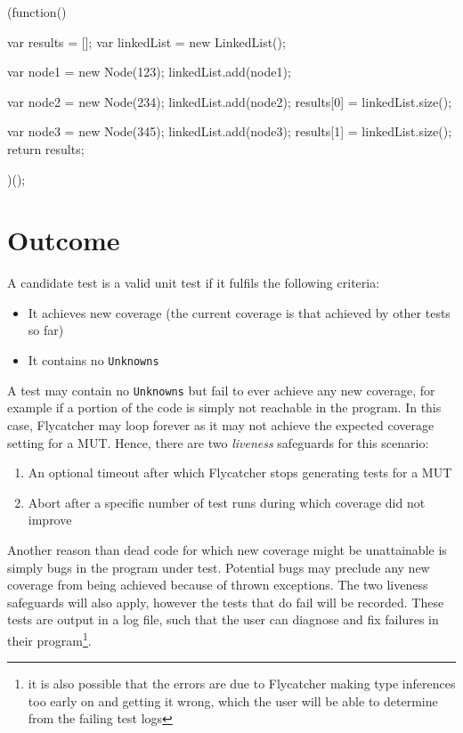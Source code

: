 \begin{verbcode}
(function() {
   var results = [];
   var linkedList = new LinkedList();

   var node1 = new Node(123);
   linkedList.add(node1);

   var node2 = new Node(234);
   linkedList.add(node2);
   results[0] = linkedList.size();

   var node3 = new Node(345);
   linkedList.add(node3);
   results[1] = linkedList.size();
   return results;
})();
\end{verbcode}

\section{Outcome}

A candidate test is a valid unit test if it fulfils the following criteria:

\begin{itemize}
   \item It achieves new coverage (the current coverage is that achieved by other tests so far)
   \item It contains no \texttt{Unknowns}
\end{itemize}

A test may contain no \texttt{Unknowns} but fail to ever achieve any new coverage, for example if a portion of the code is simply not reachable in the program. In this case, \textsf{Flycatcher} may loop forever as it may not achieve the expected coverage setting for a MUT. Hence, there are two \emph{liveness} safeguards for this scenario:

\begin{enumerate}
   \item An optional timeout after which \textsf{Flycatcher} stops generating tests for a MUT
   \item Abort after a specific number of test runs during which coverage did not improve
\end{enumerate}

Another reason than dead code for which new coverage might be unattainable is simply bugs in the program under test. Potential bugs may preclude any new coverage from being achieved because of thrown exceptions. The two liveness safeguards will also apply, however the tests that do fail will be recorded. These tests are output in a log file, such that the user can diagnose and fix failures in their program\footnote{it is also possible that the errors are due to \textsf{Flycatcher} making type inferences too early on and getting it wrong, which the user will be able to determine from the failing test logs}.

